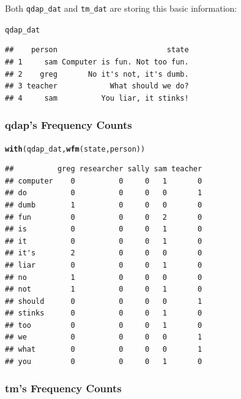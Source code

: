 \documentclass{article}\usepackage[]{graphicx}\usepackage[]{color}
\makeatletter
\newcommand{\hlstd}[1]{\textcolor[rgb]{0.345,0.345,0.345}{#1}}%
\newcommand{\hlkwd}[1]{\textcolor[rgb]{0.737,0.353,0.396}{\textbf{#1}}}%
\newenvironment{kframe}{%
 \def\at@end@of@kframe{}%
 \ifinner\ifhmode%
  \def\at@end@of@kframe{\end{minipage}}%
  \begin{minipage}{\columnwidth}%
 \fi\fi%
 \def\FrameCommand##1{\hskip\@totalleftmargin \hskip-\fboxsep
 \colorbox{shadecolor}{##1}\hskip-\fboxsep
     \hskip-\linewidth \hskip-\@totalleftmargin \hskip\columnwidth}%
 \MakeFramed {\advance\hsize-\width
   \@totalleftmargin\z@ \linewidth\hsize
   \@setminipage}}%
 {\par\unskip\endMakeFramed%
 \at@end@of@kframe}
\newenvironment{knitrout}{}{} %
\makeatother
\begin{document}
 
\noindent Both \texttt{qdap\_dat} and \texttt{tm\_dat} are storing this basic information:

\begin{knitrout}
\color{fgcolor}\begin{kframe}
\begin{alltt}
\hlstd{qdap_dat}
\end{alltt}
\begin{verbatim}
##    person                         state
## 1     sam Computer is fun. Not too fun.
## 2    greg       No it's not, it's dumb.
## 3 teacher            What should we do?
## 4     sam          You liar, it stinks!
\end{verbatim}
\end{kframe}
\end{knitrout}


\subsubsection{qdap's Frequency Counts}

\begin{knitrout}
\color{fgcolor}\begin{kframe}
\begin{alltt}
\hlkwd{with}\hlstd{(qdap_dat,} \hlkwd{wfm}\hlstd{(state, person))}
\end{alltt}
\begin{verbatim}
##          greg researcher sally sam teacher
## computer    0          0     0   1       0
## do          0          0     0   0       1
## dumb        1          0     0   0       0
## fun         0          0     0   2       0
## is          0          0     0   1       0
## it          0          0     0   1       0
## it's        2          0     0   0       0
## liar        0          0     0   1       0
## no          1          0     0   0       0
## not         1          0     0   1       0
## should      0          0     0   0       1
## stinks      0          0     0   1       0
## too         0          0     0   1       0
## we          0          0     0   0       1
## what        0          0     0   0       1
## you         0          0     0   1       0
\end{verbatim}
\end{kframe}
\end{knitrout}


\subsubsection{tm's Frequency Counts}
\end{document}
